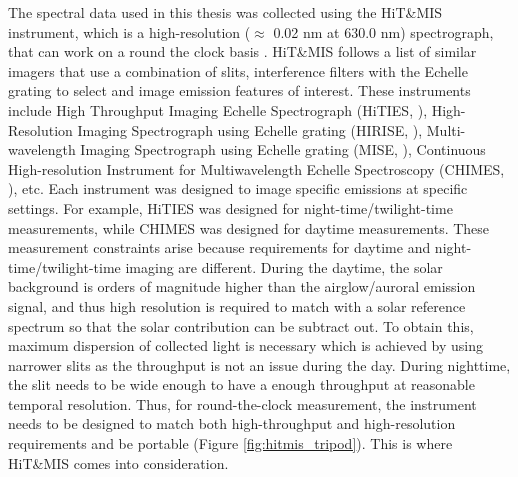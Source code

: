 \documentclass[crop=false,class=mitthesis,oneside,font=12pt]{standalone}
\begin{document}
The spectral data used in this thesis was collected using the HiT\&MIS instrument, which is a high-resolution ($\approx$ 0.02 nm at 630.0 nm) spectrograph, that can work on a round the clock basis \citep{hitmis}. HiT\&MIS follows a list of similar imagers that use a combination of slits, interference filters with the Echelle grating to select and image emission features of interest. These instruments include High Throughput Imaging Echelle Spectrograph (HiTIES, \cite{hities}), High-Resolution Imaging Spectrograph using Echelle grating (HIRISE, \cite{hirise}), Multi-wavelength Imaging Spectrograph using Echelle grating (MISE, \cite{mise}), Continuous High-resolution Instrument for Multiwavelength Echelle Spectroscopy (CHIMES, \cite{chimes}), etc. Each instrument was designed to image specific emissions at specific settings. For example, HiTIES was designed for night-time/twilight-time measurements, while CHIMES was designed for daytime measurements. These measurement constraints arise because requirements for daytime and night-time/twilight-time imaging are different. During the daytime, the solar background is orders of magnitude higher than the airglow/auroral emission signal, and thus high resolution is required to match with a solar reference spectrum so that the solar contribution can be subtract out. To obtain this, maximum dispersion of collected light is necessary which is achieved by using narrower slits as the throughput is not an issue during the day. During nighttime, the slit needs to be wide enough to have a enough throughput at reasonable temporal resolution. Thus, for round-the-clock measurement, the instrument needs to be designed to match both high-throughput and high-resolution requirements and be portable (Figure \ref{fig:hitmis_tripod}). This is where HiT\&MIS comes into consideration.
\end{document}
